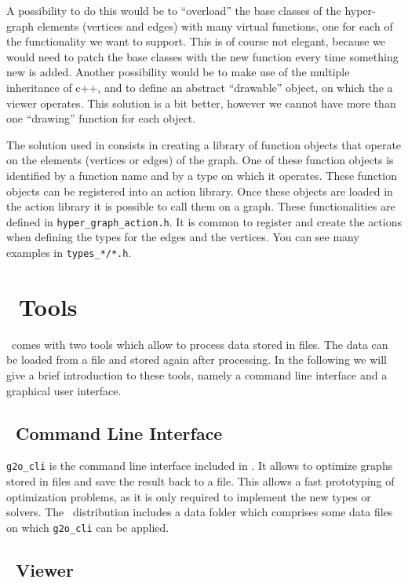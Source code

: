\documentclass[a4paper]{article}
\begin{document}
A possibility to do this would be to ``overload'' the base classes of
the hyper-graph elements (vertices and edges) with many virtual
functions, one for each of the functionality we want to support.  This
is of course not elegant, because we would need to patch the base
classes with the new function every time something new is added.
Another possibility would be to make use of the multiple inheritance
of c++, and to define an abstract ``drawable'' object, on which the a
viewer operates.  This solution is a bit better, however we cannot
have more than one ``drawing'' function for each object.

The solution used in \gopt{} consists in creating a library of
function objects that operate on the elements (vertices or edges) of
the graph.  One of these function objects is identified by a function
name and by a type on which it operates.  These function objects can
be registered into an action library.  Once these objects are loaded
in the action library it is possible to call them on a graph.  These
functionalities are defined in \verb+hyper_graph_action.h+.  It is
common to register and create the actions when defining the types for
the edges and the vertices.  You can see many examples in
\verb+types_*/*.h+.

\section{\gopt\ Tools}
\gopt\ comes with two tools which allow to process data stored in
files. The data can be loaded from a file and stored again after
processing. In the following we will give a brief introduction to these
tools, namely a command line interface and a graphical user interface.

\subsection{\gopt\ Command Line Interface}

\verb+g2o_cli+ is the command line interface included in \gopt. It
allows to optimize graphs stored in files and save the result back to a
file. This allows a fast prototyping of optimization problems, as it is
only required to implement the new types or solvers. The \gopt\
distribution includes a data folder which comprises some data files on
which \verb+g2o_cli+ can be applied.

\subsection{\gopt\ Viewer}
\end{document}
